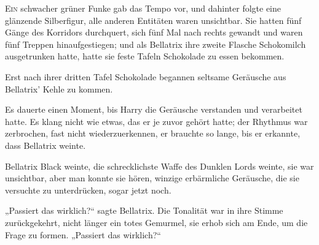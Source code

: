 
\lettrine{E}{in} schwacher grüner Funke gab das Tempo vor, und dahinter folgte eine glänzende Silberfigur, alle anderen Entitäten waren unsichtbar. Sie hatten fünf Gänge des Korridors durchquert, sich fünf Mal nach rechts gewandt und waren fünf Treppen hinaufgestiegen; und als Bellatrix ihre zweite Flasche Schokomilch ausgetrunken hatte, hatte sie feste Tafeln Schokolade zu essen bekommen.

Erst nach ihrer dritten Tafel Schokolade begannen seltsame Geräusche aus Bellatrix’ Kehle zu kommen.

Es dauerte einen Moment, bis Harry die Geräusche verstanden und verarbeitet hatte. Es klang nicht wie etwas, das er je zuvor gehört hatte; der Rhythmus war zerbrochen, fast nicht wiederzuerkennen, er brauchte so lange, bis er erkannte, dass Bellatrix weinte.

Bellatrix Black weinte, die schrecklichste Waffe des Dunklen Lords weinte, sie war unsichtbar, aber man konnte sie hören, winzige erbärmliche Geräusche, die sie versuchte zu unterdrücken, sogar jetzt noch.

„Passiert das wirklich?“ sagte Bellatrix. Die Tonalität war in ihre Stimme zurückgekehrt, nicht länger ein totes Gemurmel, sie erhob sich am Ende, um die Frage zu formen.
„Passiert das wirklich?“

